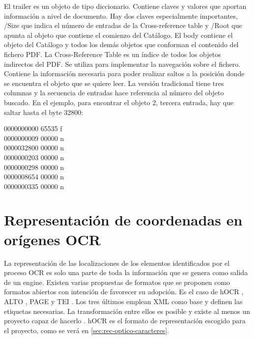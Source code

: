 El trailer es un objeto de tipo diccionario. Contiene claves y valores que aportan información a nivel de documento. Hay dos claves especialmente importantes, /Size que indica el número de entradas de la Cross-reference table y /Root que apunta al objeto que contiene el comienzo del Catálogo. El body contiene el objeto del Catálogo y todos los demás objetos que conforman el contenido del fichero PDF. La Cross-Reference Table es un índice de todos los objetos indirectos del PDF. Se utiliza para implementar la navegación sobre el fichero. Contiene la información necesaria para poder realizar saltos a la posición donde se encuentra el objeto que se quiere leer. La versión tradicional tiene tres columnas y la secuencia de entradas hace referencia al número del objeto buscado. En el ejemplo, para encontrar el objeto 2, tercera entrada, hay que saltar hasta el byte 32800:

0000000000 65535 f\\
0000000009 00000 n\\
0000032800 00000 n\\
0000000203 00000 n\\
0000000298 00000 n\\
0000008654 00000 n\\
0000000335 00000 n



\section{Representación de coordenadas en orígenes OCR}

La representación de las localizaciones de los elementos identificados por el proceso OCR es solo una parte de toda la información que se genera como salida de un engine. Existen varias propuestas de formatos que se proponen como formatos abiertos con intención de favorecer su adopción. Es el caso de hOCR \cite{ocrRepres_hocr_breuel_spec}, ALTO \cite{ocrRepres_alto_spec}, PAGE \cite{ocrRepres_page_pletschacher_paper} y TEI \cite{ocrRepres_tei_project}. Los tres últimos emplean XML como base y definen las etiquetas necesarias. La transformación entre ellos es posible y existe al menos un proyecto capaz de hacerlo
\cite{ocrRepres_conversion_ocrFileformat}. hOCR es el formato de representación escogido para el proyecto, como se verá en \ref{sec:rec-optico-caracteres}.

